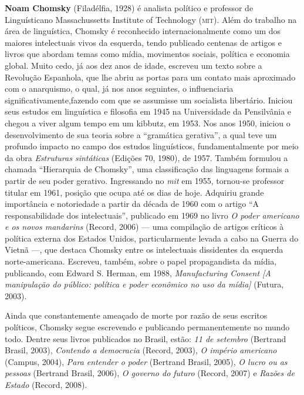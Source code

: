 \textbf{Noam Chomsky} (Filadélfia, 1928) é analista político e professor de Linguísticano Massachussetts Institute of Technology (\textsc{mit}). Além do trabalho na área de linguística, Chomsky é reconhecido internacionalmente como um dos maiores intelectuais vivos da esquerda, tendo publicado centenas de artigos e livros que abordam temas como mídia, movimentos sociais, política e economia global. Muito cedo, já aos dez anos de idade, escreveu um texto sobre a Revolução Espanhola, que lhe abriu as portas para um contato mais aproximado com o anarquismo, o qual, já nos anos seguintes, o influenciaria significativamente,fazendo com que se assumisse um socialista libertário. 
Iniciou seus estudos em linguística e filosofia em 1945 na Universidade da Pensilvânia e chegou a viver algum tempo em um kibbutz, em 1953. Nos anos 1950, iniciou o desenvolvimento de sua teoria sobre a “gramática gerativa”, a qual teve um profundo impacto no campo dos estudos linguísticos, fundamentalmente por meio da obra \textit{Estruturas sintáticas} (Edições 70, 1980), de 1957. Também formulou a chamada “Hierarquia de Chomsky”, uma classificação das linguagens formais a partir de seu poder gerativo. Ingressando no \textit{mit} em 1955, tornou-se professor titular em 1961, posição que ocupa até os dias de hoje. Adquiriu grande importância e notoriedade a partir da década de 1960 com o artigo “A responsabilidade dos intelectuais”, publicado em 1969 no livro \textit{O poder americano e os novos mandarins} (Record, 2006) --- uma compilação de artigos críticos à política externa dos Estados Unidos, particularmente levada a cabo na Guerra do Vietnã ---, que destaca Chomsky entre os intelectuais dissidentes da esquerda norte-americana. Escreveu, também, sobre o papel propagandista da mídia, publicando, com Edward S. Herman, em 1988, \textit{Manufacturing Consent [A manipulação do público: política e poder econômico no uso da mídia]} (Futura, 2003). 

\pagebreak
\thispagestyle{empty}

Ainda que constantemente ameaçado de morte por razão de seus escritos políticos, Chomsky segue escrevendo e publicando permanentemente no mundo todo. Dentre seus livros publicados no Brasil, estão: \textit{11 de setembro} (Bertrand Brasil, 2003), \textit{Contendo a democracia} (Record, 2003), \textit{O império americano} (Campus, 2004), \textit{Para entender o poder} (Bertrand Brasil, 2005), \textit{O lucro ou as pessoas} (Bertrand Brasil, 2006), \textit{O governo do futuro} (Record, 2007) e \textit{Razões de Estado} (Record, 2008).

